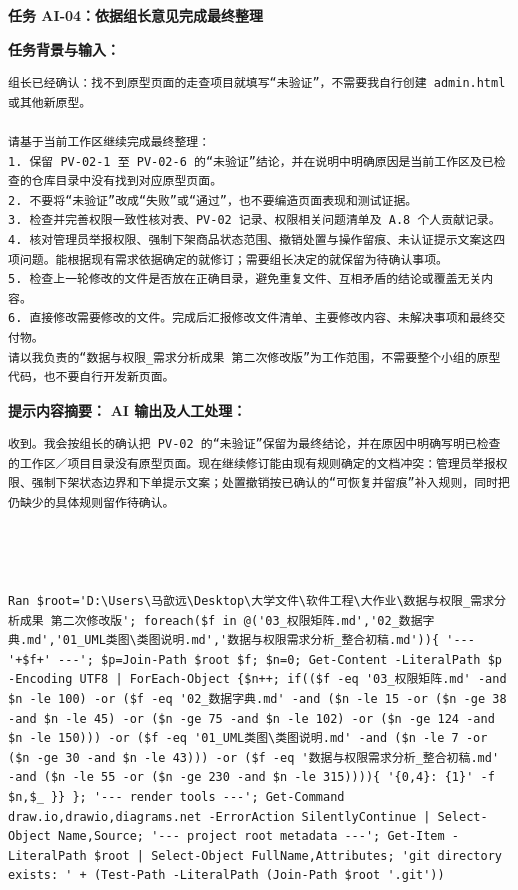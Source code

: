 \documentclass[heading=true,UTF8,a4paper,zihao=-4]{ctexart}
\begin{document}
\begin{QABox}
\textbf{任务 AI-04：依据组长意见完成最终整理}

\textbf{任务背景与输入：}
\begin{lstlisting}
组长已经确认：找不到原型页面的走查项目就填写“未验证”，不需要我自行创建 admin.html 或其他新原型。

请基于当前工作区继续完成最终整理：
1. 保留 PV-02-1 至 PV-02-6 的“未验证”结论，并在说明中明确原因是当前工作区及已检查的仓库目录中没有找到对应原型页面。
2. 不要将“未验证”改成“失败”或“通过”，也不要编造页面表现和测试证据。
3. 检查并完善权限一致性核对表、PV-02 记录、权限相关问题清单及 A.8 个人贡献记录。
4. 核对管理员举报权限、强制下架商品状态范围、撤销处置与操作留痕、未认证提示文案这四项问题。能根据现有需求依据确定的就修订；需要组长决定的就保留为待确认事项。
5. 检查上一轮修改的文件是否放在正确目录，避免重复文件、互相矛盾的结论或覆盖无关内容。
6. 直接修改需要修改的文件。完成后汇报修改文件清单、主要修改内容、未解决事项和最终交付物。
请以我负责的“数据与权限_需求分析成果 第二次修改版”为工作范围，不需要整个小组的原型代码，也不要自行开发新页面。
\end{lstlisting}

\textbf{提示内容摘要：}
\textbf{AI 输出及人工处理：}
\begin{lstlisting}
收到。我会按组长的确认把 PV-02 的“未验证”保留为最终结论，并在原因中明确写明已检查的工作区／项目目录没有原型页面。现在继续修订能由现有规则确定的文档冲突：管理员举报权限、强制下架状态边界和下单提示文案；处置撤销按已确认的“可恢复并留痕”补入规则，同时把仍缺少的具体规则留作待确认。




Ran $root='D:\Users\马歆远\Desktop\大学文件\软件工程\大作业\数据与权限_需求分析成果 第二次修改版'; foreach($f in @('03_权限矩阵.md','02_数据字典.md','01_UML类图\类图说明.md','数据与权限需求分析_整合初稿.md')){ '--- '+$f+' ---'; $p=Join-Path $root $f; $n=0; Get-Content -LiteralPath $p -Encoding UTF8 | ForEach-Object {$n++; if(($f -eq '03_权限矩阵.md' -and $n -le 100) -or ($f -eq '02_数据字典.md' -and ($n -le 15 -or ($n -ge 38 -and $n -le 45) -or ($n -ge 75 -and $n -le 102) -or ($n -ge 124 -and $n -le 150))) -or ($f -eq '01_UML类图\类图说明.md' -and ($n -le 7 -or ($n -ge 30 -and $n -le 43))) -or ($f -eq '数据与权限需求分析_整合初稿.md' -and ($n -le 55 -or ($n -ge 230 -and $n -le 315)))){ '{0,4}: {1}' -f $n,$_ }} }; '--- render tools ---'; Get-Command draw.io,drawio,diagrams.net -ErrorAction SilentlyContinue | Select-Object Name,Source; '--- project root metadata ---'; Get-Item -LiteralPath $root | Select-Object FullName,Attributes; 'git directory exists: ' + (Test-Path -LiteralPath (Join-Path $root '.git'))





\end{lstlisting}
\end{QABox}
\end{document}
